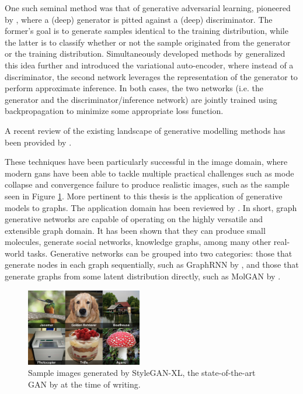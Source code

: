 One such seminal method was that of generative adversarial learning, pioneered
by \cite{goodfellow2014generative}, where a (deep) generator is pitted against
a (deep) discriminator. The former's goal is to generate samples identical to
the training distribution, while the latter is to classify whether or not the
sample originated from the generator or the training distribution.
Simultaneously developed methods by \cite{kingma2013auto} generalized this idea
further and introduced the variational auto-encoder, where instead of a
discriminator, the second network leverages the representation of the generator
to perform approximate inference. In both cases, the two networks (i.e. the
generator and the discriminator/inference network) are jointly trained using
backpropagation to minimize some appropriate loss function.

A recent review of the existing landscape of generative modelling methods has
been provided by \cite{bond2021deep}.

These techniques have been particularly successful in the image domain, where
modern \acrfull{gans} have been able to tackle multiple practical challenges such as mode
collapse and convergence failure to produce realistic images, such as the sample
seen in Figure \ref{fig:styleganxl}. More pertinent to this thesis is the
application of generative models to graphs. The application domain has been
reviewed by \cite{zhou2020graph}. In short, graph generative networks are
capable of operating on the highly versatile and extensible graph domain. It has
been shown that they can produce small molecules, generate social networks,
knowledge graphs, among many other real-world tasks. Generative networks can be
grouped into two categories: those that generate nodes in each graph
sequentially, such as GraphRNN by \cite{you2018graphrnn}, and those that generate
graphs from some latent distribution directly, such as MolGAN by
\cite{de2018molgan}.

\begin{figure}
  \centering
  \includegraphics[width=0.45\textwidth]{./figures/representative_image.jpg}
  \caption[Sample images generated by StyleGAN-XL]{Sample images generated by StyleGAN-XL, the state-of-the-art GAN
by \cite{sauer2022stylegan} at the time of writing.}
  \label{fig:styleganxl}
\end{figure}

